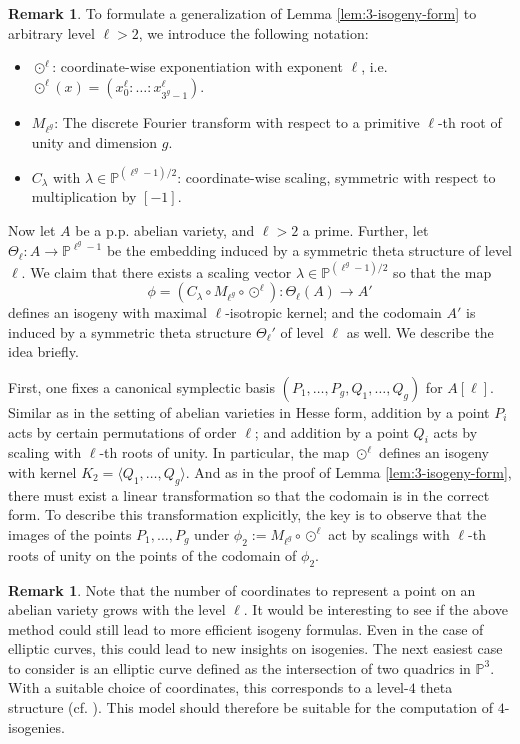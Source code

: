\documentclass[11pt]{amsart}
\theoremstyle{definition}
\newtheorem{remark}[theorem]{Remark}
\newcommand{\PP}{\mathbb{P}}
\begin{document}
\begin{remark} \label{rem:generalization-level}
	 To formulate a generalization of Lemma \ref{lem:3-isogeny-form} to arbitrary level $\ell>2$, we introduce the following notation:
	\begin{itemize}
		\item $\odot^\ell$:  coordinate-wise exponentiation with exponent $\ell$, i.e. $\odot^\ell(x) = (x_0^\ell : \dots : x_{3^g-1}^\ell)$.
		\item $M_{\ell^g}$: The discrete Fourier transform with respect to a primitive $\ell$-th root of unity and dimension $g$.
		\item $C_{\lambda}$ with $\lambda \in \PP^{{(\ell^{g}-1)}/2}$: coordinate-wise scaling, symmetric with respect to multiplication by $[-1]$. 
	\end{itemize}
	
	Now let $A$ be a p.p. abelian variety, and $\ell>2$ a prime. Further, let 
	\(
	\Theta_\ell: A \to \PP^{\ell^{g}-1}
	\)
	be the embedding induced by a symmetric theta structure of level $\ell$. 
	We claim that there exists a scaling vector $\lambda \in \PP^{{(\ell^{g}-1)}/2}$ so that the map
	\[
	\phi = (C_\lambda \circ M_{\ell^g} \circ \odot^\ell):  \Theta_\ell(A) \to {A}'
	\]
	defines an isogeny with maximal $\ell$-isotropic kernel; and the codomain ${A}'$ is induced by a symmetric theta structure $\Theta_\ell'$ of level $\ell$ as well.	We describe the idea briefly.
    
    First, one fixes a canonical symplectic basis  $(P_1, \dots, P_g, Q_1, \dots, Q_g)$ for $A[\ell]$. Similar as in the setting of abelian varieties in Hesse form, addition by a point $P_i$ acts by certain permutations of order $\ell$; and addition by a point $Q_i$ acts by scaling with $\ell$-th roots of unity. In particular, the map $\odot^\ell$ defines an isogeny with kernel $K_2 = \langle Q_1, \dots, Q_g\rangle$. And as in the proof of Lemma \ref{lem:3-isogeny-form}, there must exist a linear transformation so that the codomain is in the correct form. To describe this transformation explicitly, the key is to observe that the images of the points $P_1, \dots, P_g $ under $\phi_2 := M_{\ell^g}\circ \odot^{\ell}$ act by scalings with $\ell$-th roots of unity on the points of the codomain of $\phi_2$.
\end{remark}

\begin{remark}
    Note that the number of coordinates to represent a point on an abelian variety grows with the level $\ell$. It would be interesting to see if the above method could still lead to more efficient isogeny formulas. Even in the case of elliptic curves, this could lead to new insights on isogenies. The next easiest case to consider is an elliptic curve defined as the intersection of two quadrics in $\PP^3$. With a suitable choice of coordinates, this corresponds to a level-$4$ theta structure (cf. \cite[\S 5, Case (c)]{mumford1966equations}). This model should therefore be suitable for the computation of $4$-isogenies.
\end{remark}
	
	
	
	
\end{document}
